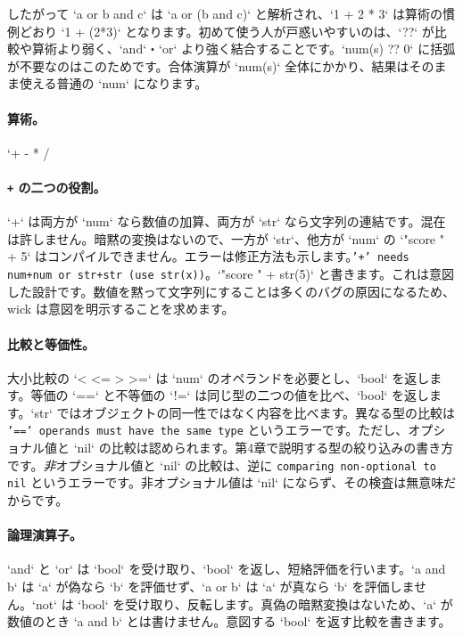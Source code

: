 \noindent
したがって `a or b and c` は `a or (b and c)` と解析され、`1 + 2 * 3` は算術の慣例どおり `1 + (2*3)` となります。初めて使う人が戸惑いやすいのは、`??` が比較や算術より弱く、`and`・`or` より強く結合することです。`num(s) ?? 0` に括弧が不要なのはこのためです。合体演算が `num(s)` 全体にかかり、結果はそのまま使える普通の `num` になります。

\paragraph{算術。} `+ - * / %

\paragraph{\texttt{+} の二つの役割。} `+` は両方が `num` なら数値の加算、両方が `str` なら文字列の連結です。混在は許しません。暗黙の変換はないので、一方が `str`、他方が `num` の `"score " + 5` はコンパイルできません。エラーは修正方法も示します。\texttt{'+' needs num+num or str+str (use str(x))}。`"score " + str(5)` と書きます。これは意図した設計です。数値を黙って文字列にすることは多くのバグの原因になるため、wick は意図を明示することを求めます。

\paragraph{比較と等価性。} 大小比較の `< <= > >=` は `num` のオペランドを必要とし、`bool` を返します。等価の `==` と不等価の `!=` は同じ型の二つの値を比べ、`bool` を返します。`str` ではオブジェクトの同一性ではなく内容を比べます。異なる型の比較は \texttt{'==' operands must have the same type} というエラーです。ただし、オプショナル値と `nil` の比較は認められます。第4章で説明する型の絞り込みの書き方です。\emph{非}オプショナル値と `nil` の比較は、逆に \texttt{comparing non-optional to nil} というエラーです。非オプショナル値は `nil` にならず、その検査は無意味だからです。

\paragraph{論理演算子。} `and` と `or` は `bool` を受け取り、`bool` を返し、短絡評価を行います。`a and b` は `a` が偽なら `b` を評価せず、`a or b` は `a` が真なら `b` を評価しません。`not` は `bool` を受け取り、反転します。真偽の暗黙変換はないため、`a` が数値のとき `a and b` とは書けません。意図する `bool` を返す比較を書きます。

